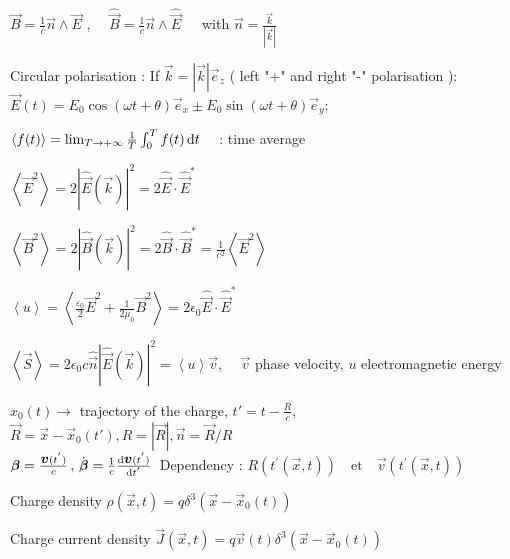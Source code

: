 \item $\vec{B} = \frac{1}{c} \vec{n} \wedge \vec{E} $ , $\quad \widehat{\vec{B}} = \frac{1}{c} \vec{n} \wedge \widehat{\vec{E}} \, \quad $ with $\vec{n} = \frac{\vec{k}}{|\vec{k}|} $

\item Circular polarisation : If $\vec{k} = |\vec{k}|\vec{e}_z$ ( left "+" and right "-" polarisation 
):\\
$\vec{E}(t) = E_0 \cos(\omega t + \theta)\vec{e}_x \pm E_0 \sin(\omega t + \theta)\vec{e}_y$;
\squishend



\squishlist 
\item $\left< f(t) \right> = \lim_{T \rightarrow +\infty} \frac{1}{T} \int_{0}^{T} f(t) \, \textrm{d} t \quad $ : time average

\item $\left< \vec{E}^2\right> = 2|\widehat{\vec{E}}(\vec{k})|^2 = 2\widehat{\vec{E}}\cdot\widehat{\vec{E}}^*$

\item $\left< \vec{B}^2\right> = 2|\widehat{\vec{B}}(\vec{k})|^2 = 2 \widehat{\vec{B}} \cdot\widehat{\vec{B}}^* = \frac{1}{c^2}\left< \vec{E}^2\right> $

\item $\left< u \right> = \left< \frac{\varepsilon_0}{2} \vec{E}^2 + \frac{1}{2\mu_0} \vec{B}^2 \right> = 2\epsilon_0 \widehat{\vec{E}}\cdot\widehat{\vec{E}}^*$

\item $\left< \vec{S} \right> = 2\epsilon_0 c \hat{\vec{n}} | \widehat{\vec{E}}(\vec{k})|^2 = \left< u\right> \vec{v}$, $\quad \vec{v}$ phase velocity, $u$ electromagnetic energy
\squishend

\squishlist
\item $x_0(t) \rightarrow$ trajectory of the charge, $t'=t-\frac{R}{c}$, $\vec{R} = \vec{x}-\vec{x}_0(t'), R=|\vec{R}|, \vec{n} = \vec{R}/R$\\
$\mbox{\boldmath$\beta$} = \frac{\mbox{\boldmath$v$}(t^{'})}{c} \, , \, \dot{\mbox{\boldmath$\beta$}} = \frac{1}{c}\frac{\textrm{d} \mbox{\boldmath$v$}(t^{'})}{\textrm{d} t^{'}} \, $ Dependency : $R(t^{'}(\vec{x},t))  \quad  \text{et} \quad \vec{v}(t^{'}(\vec{x},t))$

\item Charge density $\rho(\vec x,t) = q\delta^{3}(\vec x-\vec x_{0}(t))$

\item Charge current density $\vec J(\vec x,t) = q\vec v(t)\delta^{3}(\vec x-\vec x_{0}(t))$

